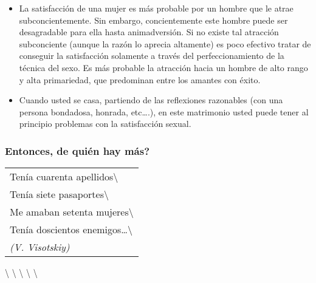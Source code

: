 \begin{itemize}
\tightlist
\item
  La satisfacción de una mujer es más probable por un hombre que le
  atrae subconcientemente. Sin embargo, concientemente este hombre puede
  ser desagradable para ella hasta animadversión. Si no existe tal
  atracción subconciente (aunque la razón lo aprecia altamente) es poco
  efectivo tratar de conseguir la satisfacción solamente a través del
  perfeccionamiento de la técnica del sexo. Es más probable la atracción
  hacia un hombre de alto rango y alta primariedad, que predominan entre
  los amantes con éxito.
\item
  Cuando usted se casa, partiendo de las reflexiones razonables (con una
  persona bondadosa, honrada, etc\ldots{}.), en este matrimonio usted
  puede tener al principio problemas con la satisfacción sexual.
\end{itemize}

\protect\hypertarget{M15}{}{}

\subsubsection{Entonces, de quién hay
más?}\label{entonces-de-quiuxe9n-hay-muxe1s}

\begin{longtable}[]{@{}l@{}}
\toprule
Tenía cuarenta apellidos\textbackslash{}\tabularnewline
Tenía siete pasaportes\textbackslash{}\tabularnewline
Me amaban setenta mujeres\textbackslash{}\tabularnewline
Tenía doscientos enemigos\ldots{}\textbackslash{}\tabularnewline
\emph{(V. Visotskiy)}\tabularnewline
\bottomrule
\end{longtable}

\textbackslash{} \textbackslash{} \textbackslash{} \textbackslash{}
\textbackslash{}

